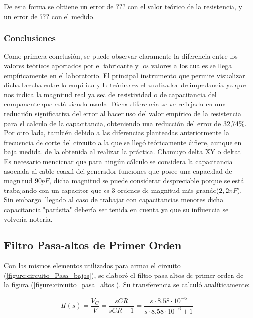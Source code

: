 \documentclass[11pt, a4paper]{article}
\begin{document}
 De esta forma se obtiene un error de $ ???  $ con el valor teórico de la resistencia, y un error de $  ???  $ con el medido.
\subsubsection*{Conclusiones}
Como primera conclusión, se puede observar claramente la diferencia entre los valores teóricos aportados por el fabricante y los valores a los cuales se llega empíricamente en el laboratorio. El principal instrumento que permite visualizar dicha brecha entre lo empírico y lo teórico es el analizador de impedancia ya que nos indica la magnitud real ya sea de resistividad o de capacitancia del componente que está siendo usado. Dicha diferencia se ve reflejada en una reducción significativa del error al hacer uso del valor empírico de la resistencia para el calculo de la capacitancia, obteniendo una reducción del error de 32,74\%. Por otro lado, también debido a las diferencias planteadas anteriormente la frecuencia de corte del circuito a la que se llegó teóricamente difiere, aunque en baja medida, de la obtenida al realizar la práctica. 
Chamuyo  delta XY o deltat
Es necesario mencionar que para ningún cálculo se considera la capacitancia asociada al cable coaxil del generador funciones que posee una capacidad de magnitud $90pF$, dicha magnitud se puede considerar despreciable porque se está trabajando con un capacitor que es 3 ordenes de magnitud más grande($2,2nF$). Sin embargo, llegado al caso de trabajar con capacitancias menores dicha capacitancia "parásita" debería ser tenida en cuenta ya que su influencia se volvería notoria.

\break

\subsection*{Filtro Pasa-altos de Primer Orden}

Con los mismos elementos utilizados para armar el circuito (\ref{figure:circuito_Pasa_bajos}), se elaboró el filtro pasa-altos de primer orden de la figura (\ref{figure:circuito_pasa_altos}). Su transferencia se calculó analíticamente:

\begin{equation}
	H \left(s \right) = \frac{V_C}{V} = \frac{sCR}{sCR + 1} = \frac{s \cdot 8.58 \cdot 10^{-6}}{s \cdot 8.58 \cdot 10^{-6} + 1}
	\label{equ:transfpasaaltos}
\end{equation}
\end{document}
